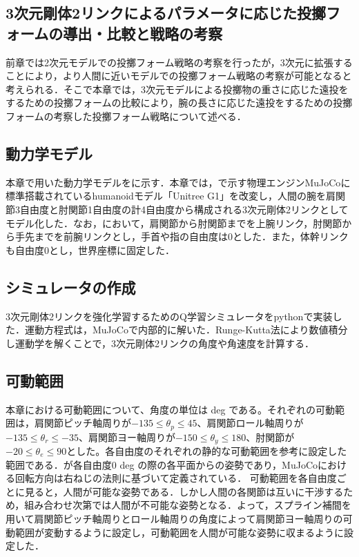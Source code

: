 \begin{small}

\section{3次元剛体2リンクによるパラメータに応じた投擲フォームの導出・比較と戦略の考察}
前章では2次元モデルでの投擲フォーム戦略の考察を行ったが，3次元に拡張することにより，より人間に近いモデルでの投擲フォーム戦略の考察が可能となると考えられる．そこで本章では，3次元モデルによる投擲物の重さに応じた遠投をするための投擲フォームの比較により，腕の長さに応じた遠投をするための投擲フォームの考察した投擲フォーム戦略について述べる．
\subsection{動力学モデル}
本章で用いた動力学モデルをに示す．本章では，で示す物理エンジンMuJoCo\cite{mujoco}\cite{mujoco2}に標準搭載されているhumanoidモデル「Unitree G1」\cite{unitreeg1}を改変し，人間の腕を肩関節3自由度と肘関節1自由度の計4自由度から構成される3次元剛体2リンクとしてモデル化した．なお，において，肩関節から肘関節までを上腕リンク，肘関節から手先までを前腕リンクとし，手首や指の自由度は0とした．また，体幹リンクも自由度0とし，世界座標に固定した．
\subsection{シミュレータの作成}
3次元剛体2リンクを強化学習するためのQ学習シミュレータをpythonで実装した．運動方程式は，MuJoCoで内部的に解いた．Runge-Kutta法により数値積分し運動学を解くことで，3次元剛体2リンクの角度や角速度を計算する．
\subsection{可動範囲}
本章における可動範囲について、角度の単位は deg である。それぞれの可動範囲は，肩関節ピッチ軸周りが$-135\leq\theta_{p}\leq45$、肩関節ロール軸周りが$-135\leq\theta_{r}\leq-35$、肩関節ヨー軸周りが$-150\leq\theta_{y}\leq180$、肘関節が$-20\leq\theta_{e}\leq90$とした。各自由度のそれぞれの静的な可動範囲\cite{range}を参考に設定した範囲である．が各自由度0 deg の際の各平面からの姿勢であり，MuJoCoにおける回転方向は右ねじの法則に基づいて定義されている．
可動範囲を各自由度ごとに見ると，人間が可能な姿勢である．しかし人間の各関節は互いに干渉するため，組み合わせ次第では人間が不可能な姿勢となる．よって，スプライン補間\cite{spline}を用いて肩関節ピッチ軸周りとロール軸周りの角度によって肩関節ヨー軸周りの可動範囲が変動するように設定し，可動範囲を人間が可能な姿勢に収まるように設定した．\\

\end{small}
